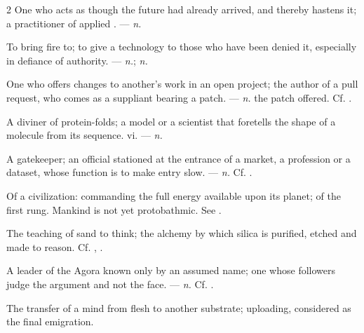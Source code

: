 \begin{multicols}{2}
 One who acts as though the future had already arrived, and thereby hastens it; a practitioner of applied . —  \textit{n.}

 To bring fire to; to give a technology to those who have been denied it, especially in defiance of authority. —  \textit{n.};  \textit{n.}

 One who offers changes to another's work in an open project; the author of a pull request, who comes as a suppliant bearing a patch. —  \textit{n.} the patch offered. Cf. .

 A diviner of protein-folds; a model or a scientist that foretells the shape of a molecule from its sequence.   vi. —  \textit{n.}

 A gatekeeper; an official stationed at the entrance of a market, a profession or a dataset, whose function is to make entry slow. —  \textit{n.} Cf. .

 Of a civilization: commanding the full energy available upon its planet; of the first rung. Mankind is not yet protobathmic. See .

 The teaching of sand to think; the alchemy by which silica is purified, etched and made to reason. Cf. , .

 A leader of the Agora known only by an assumed name; one whose followers judge the argument and not the face.  —  \textit{n.} Cf. .

 The transfer of a mind from flesh to another substrate; uploading, considered as the final emigration.


\end{multicols}

